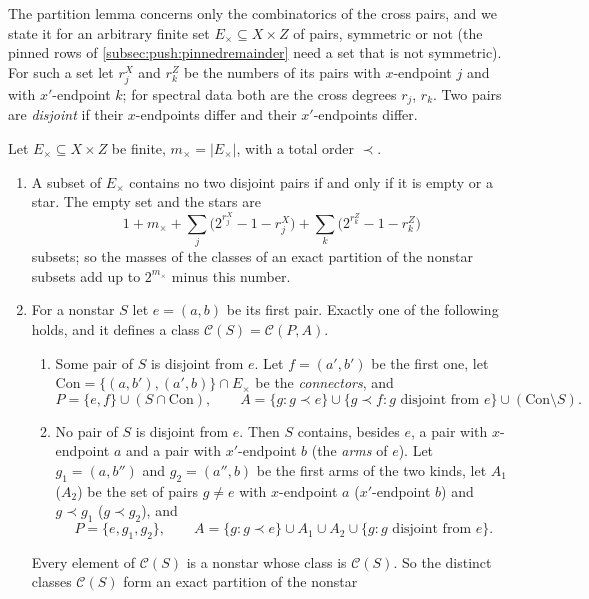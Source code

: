 The partition lemma concerns only the combinatorics of the cross pairs, and we
state it for an arbitrary finite set $E_\times\subseteq X\times Z$ of pairs,
symmetric or not (the pinned rows of \cref{subsec:push:pinnedremainder} need a
set that is not symmetric). For such a set let $r^X_j$ and $r^Z_k$ be the numbers
of its pairs with $x$-endpoint $j$ and with $x'$-endpoint $k$; for spectral data
both are the cross degrees $r_j$, $r_k$. Two pairs are \emph{disjoint} if their
$x$-endpoints differ and their $x'$-endpoints differ.

\begin{lemma}\label{lem:advance:compressed-partition}
Let $E_\times\subseteq X\times Z$ be finite, $m_\times=|E_\times|$, with a total
order $\prec$.
\begin{enumerate}[label=\textup{(\alph*)}]
\item A subset of $E_\times$ contains no two disjoint pairs if and only if it is
 empty or a star. The empty set and the stars are
 \[
  1+m_\times+\sum_j\bigl(2^{r^X_j}-1-r^X_j\bigr)+\sum_k\bigl(2^{r^Z_k}-1-r^Z_k\bigr)
 \]
 subsets; so the masses of the classes of an exact partition of the nonstar
 subsets add up to $2^{m_\times}$ minus this number.
\item For a nonstar $S$ let $e=(a,b)$ be its first pair. Exactly one of the
 following holds, and it defines a class $\mathcal C(S)=\mathcal C(P,A)$.
 \begin{enumerate}[label=\textup{(\Alph*)}]
 \item Some pair of $S$ is disjoint from $e$. Let $f=(a',b')$ be the first one,
  let $\mathrm{Con}=\{(a,b'),(a',b)\}\cap E_\times$ be the \emph{connectors}, and
  \[
   P=\{e,f\}\cup(S\cap\mathrm{Con}),\qquad
   A=\{g:g\prec e\}\cup\{g\prec f:g\text{ disjoint from }e\}\cup(\mathrm{Con}\setminus S).
  \]
 \item No pair of $S$ is disjoint from $e$. Then $S$ contains, besides $e$, a pair
  with $x$-endpoint $a$ and a pair with $x'$-endpoint $b$ (the \emph{arms} of $e$).
  Let $g_1=(a,b'')$ and $g_2=(a'',b)$ be the first arms of the two kinds, let $A_1$
  ($A_2$) be the set of pairs $g\ne e$ with $x$-endpoint $a$ ($x'$-endpoint $b$) and
  $g\prec g_1$ ($g\prec g_2$), and
  \[
   P=\{e,g_1,g_2\},\qquad
   A=\{g:g\prec e\}\cup A_1\cup A_2\cup\{g:g\text{ disjoint from }e\}.
  \]
 \end{enumerate}
 Every element of $\mathcal C(S)$ is a nonstar whose class is $\mathcal C(S)$.
 So the distinct classes $\mathcal C(S)$ form an exact partition of the nonstar

\end{enumerate}
\end{lemma}

